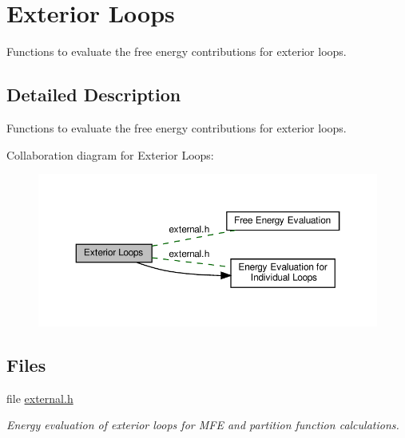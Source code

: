 \hypertarget{group__eval__loops__ext}{}\section{Exterior Loops}
\label{group__eval__loops__ext}


Functions to evaluate the free energy contributions for exterior loops.  




\subsection{Detailed Description}
Functions to evaluate the free energy contributions for exterior loops. 

Collaboration diagram for Exterior Loops\+:
\nopagebreak
\begin{figure}[H]
\begin{center}
\leavevmode
\includegraphics[width=350pt]{group__eval__loops__ext}
\end{center}
\end{figure}
\subsection*{Files}
\begin{DoxyCompactItemize}
\item 
file \hyperlink{external_8h}{external.\+h}
\begin{DoxyCompactList}\small\item\em Energy evaluation of exterior loops for M\+FE and partition function calculations. \end{DoxyCompactList}\end{DoxyCompactItemize}

